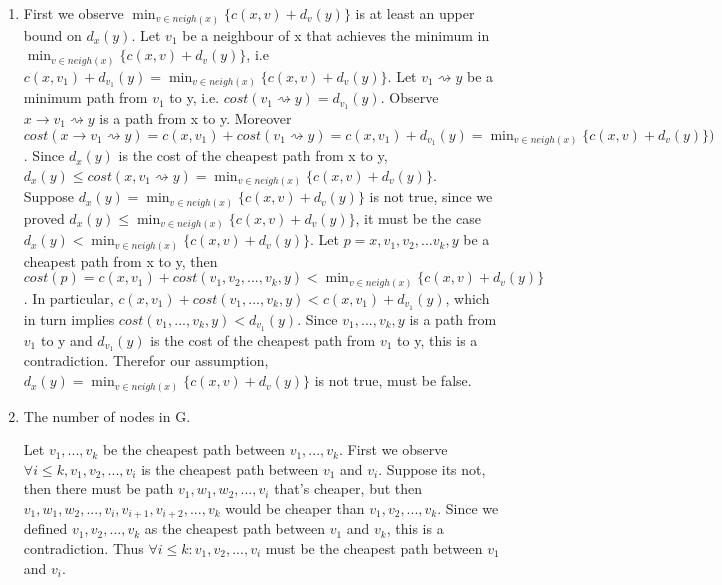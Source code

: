 \documentclass[12pt]{article}
\begin{document}
\begin{enumerate}
	\item %
        
        First we observe $\min_{v \in neigh(x)}\{c(x,v) + d_v(y)\}$
        is at least an upper bound on $d_x(y)$. Let $v_1$ be a neighbour of x that achieves the minimum in
        $\min_{v \in neigh(x)}\{c(x,v) + d_v(y)\}$, i.e $c(x,v_1)+d_{v_1}(y) = \min_{v \in neigh(x)}\{c(x,v) + d_v(y)\}$.  
        Let $v_1 \rightsquigarrow y$ be a minimum path from $v_1$
        to y, i.e. $cost(v_1 \rightsquigarrow y) = d_{v_1}(y)$. Observe $x \rightarrow v_1 \rightsquigarrow y$ is a path from x to y. Moreover
        $cost(x \rightarrow v_1 \rightsquigarrow y) = c(x, v_1) + cost(v_1 \rightsquigarrow y) = c(x, v_1) + d_{v_1}(y) =
        \min_{v \in neigh(x)}\{c(x,v) + d_v(y)\})$.
        Since $d_x(y)$ is the cost of the cheapest path from x to y, 
        $d_x(y) \leq cost(x,v_1 \rightsquigarrow y) = \min_{v \in neigh(x)}\{c(x,v) + d_v(y)\}$. \\

        Suppose $d_x(y) = \min_{v \in neigh(x)}\{c(x,v) + d_v(y)\}$ is not true, since we proved
        $d_x(y) \leq \min_{v \in neigh(x)}\{c(x,v) + d_v(y)\}$, it must be the case 
        $d_x(y) < \min_{v \in neigh(x)}\{c(x,v) + d_v(y)\}$.
        Let $p=x,v_1,v_2,...v_k,y$ be a cheapest path from x to y, then  
        $cost(p) = c(x,v_1) + cost(v_1, v_2,...,v_k,y) < \min_{v \in neigh(x)}\{c(x,v) + d_v(y)\}$. 
        In particular, $c(x, v_1) + cost(v_1,...,v_k,y) < c(x, v_1) + d_{v_1}(y)$,
        which in turn implies $cost(v_1,...,v_k,y) < d_{v_1}(y)$.
        Since $v_1,...,v_k,y$ is a path from $v_1$ to y and $d_{v_1}(y)$ is the cost of the cheapest path from 
        $v_1$ to y, this is a contradiction. Therefor our assumption, $d_x(y) = \min_{v \in neigh(x)}\{c(x,v) + d_v(y)\}$ is not true,
        must be false.

	\item %

        The number of nodes in G.

        Let $v_1,...,v_k$ be the cheapest path between $v_1,...,v_k$.  First we observe
        $\forall i \leq k, v_1, v_2, ..., v_i$ is the cheapest path between $v_1$ and $v_i$.
        Suppose its not, then there must be path $v_1,w_1,w_2,...,v_i$ that's cheaper, but then
        $v_1,w_1,w_2,...,v_i,v_{i+1},v_{i+2},...,v_k$ would be cheaper than $v_1,v_2,...,v_k$.
        Since we defined $v_1,v_2,...,v_k$ as the cheapest path between $v_1$ and $v_k$, this is a
        contradiction. Thus $\forall i \leq k: v_1, v_2, ..., v_i$ must be the cheapest path between $v_1$ and $v_i$. \\


\end{enumerate}
\end{document}
